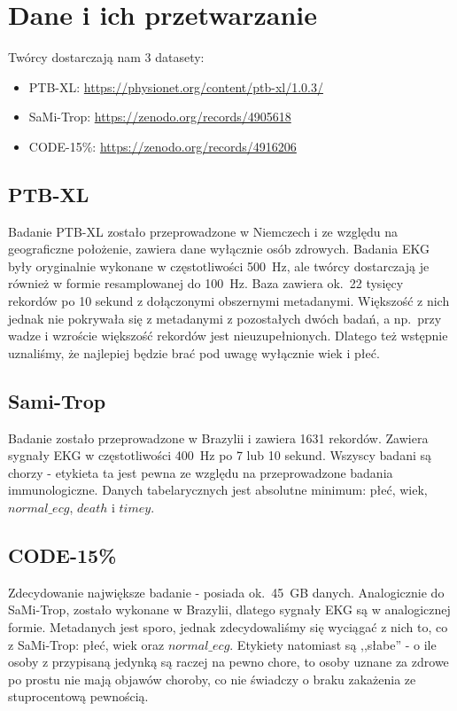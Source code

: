 \section*{Dane i ich przetwarzanie}
Twórcy dostarczają nam 3 datasety:
\begin{itemize}
    \item PTB-XL: \url{https://physionet.org/content/ptb-xl/1.0.3/}
    \item SaMi-Trop: \url{https://zenodo.org/records/4905618}
    \item CODE-15\%: \url{https://zenodo.org/records/4916206}
\end{itemize}

\subsection*{PTB-XL}
Badanie PTB-XL zostało przeprowadzone w Niemczech i ze względu na geograficzne położenie,
zawiera dane wyłącznie osób zdrowych. Badania EKG były oryginalnie wykonane w częstotliwości
500~Hz, ale twórcy dostarczają je również w formie resamplowanej do 100~Hz. Baza zawiera
ok.~22 tysięcy rekordów po 10 sekund z dołączonymi obszernymi metadanymi. Większość z nich
jednak nie pokrywała się z metadanymi z pozostałych dwóch badań, a np.\ przy wadze i wzroście
większość rekordów jest nieuzupełnionych. Dlatego też wstępnie uznaliśmy, że najlepiej będzie
brać pod uwagę wyłącznie wiek i płeć.

\subsection*{Sami-Trop}
Badanie zostało przeprowadzone w Brazylii i zawiera 1631 rekordów. Zawiera sygnały EKG
w częstotliwości 400~Hz po 7 lub 10 sekund. Wszyscy badani są chorzy - etykieta ta jest
pewna ze względu na przeprowadzone badania immunologiczne. Danych tabelarycznych jest
absolutne minimum: płeć, wiek, $normal\_ecg$, $death$ i $timey$.

\subsection*{CODE-15\%}
Zdecydowanie największe badanie - posiada ok.~45~GB danych. Analogicznie do SaMi-Trop,
zostało wykonane w Brazylii, dlatego sygnały EKG są w analogicznej formie. Metadanych jest
sporo, jednak zdecydowaliśmy się wyciągać z nich to, co z SaMi-Trop: płeć, wiek oraz
$normal\_ecg$. Etykiety natomiast są ,,słabe'' - o ile osoby z przypisaną jedynką
są raczej na pewno chore, to osoby uznane za zdrowe po prostu nie mają objawów choroby,
co nie świadczy o braku zakażenia ze stuprocentową pewnością.

